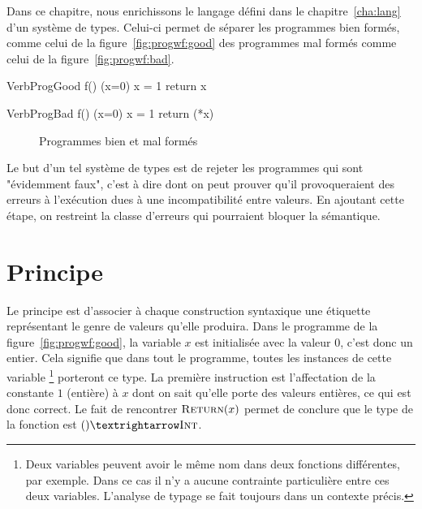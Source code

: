 Dans ce chapitre, nous enrichissons le langage défini dans le
chapitre~\ref{cha:lang} d'un système de types. Celui-ci permet de séparer les
programmes bien formés, comme celui de la figure~\ref{fig:progwf:good} des
programmes mal formés comme celui de la figure~\ref{fig:progwf:bad}.

\begin{SaveVerbatim}[]{VerbProgGood}
f()
(x=0)
{
  x = 1
  return x
}
\end{SaveVerbatim}

\begin{SaveVerbatim}[]{VerbProgBad}
f()
(x=0)
{
  x = 1
  return (*x)
}
\end{SaveVerbatim}

\begin{figure}

  \centering

  \hspace{2cm}

  \caption{Programmes bien et mal formés}
  \label{fig:progwf}

\end{figure}

Le but d'un tel système de types est de rejeter les programmes qui sont
"évidemment faux", c'est à dire dont on peut prouver qu'il provoqueraient des
erreurs à l'exécution dues à une incompatibilité entre valeurs. En ajoutant
cette étape, on restreint la classe d'erreurs qui pourraient bloquer la
sémantique.

\section{Principe}

Le principe est d'associer à chaque construction syntaxique une étiquette
représentant le genre de valeurs qu'elle produira. Dans le programme de la
figure~\ref{fig:progwf:good}, la variable $x$ est initialisée avec la valeur
$0$, c'est donc un entier. Cela signifie que dans tout le programme, toutes les
instances de cette variable
\footnote{Deux variables peuvent avoir le même nom dans deux fonctions
  différentes, par exemple. Dans ce cas il n'y a aucune contrainte particulière
  entre ces deux variables. L'analyse de typage se fait toujours dans un
  contexte précis.
}
porteront ce type. La première instruction est l'affectation de la constante $1$
(entière) à $x$ dont on sait qu'elle porte des valeurs entières, ce qui est donc
correct. Le fait de rencontrer $\textsc{Return}(x)$ permet de conclure que le type de
la fonction est $() → \tInt$.


